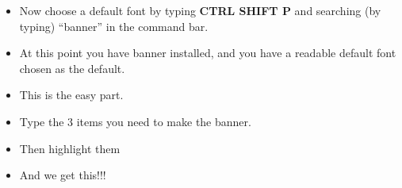 \begin{itemize}
\tightlist
\item
  Now choose a default font by typing \textbf{CTRL SHIFT P} and
  searching (by typing) ``banner'' in the command bar.
\end{itemize}

\begin{itemize}
\tightlist
\item
  At this point you have banner installed, and you have a readable
  default font chosen as the default.
\item
  This is the easy part.
\item
  Type the 3 items you need to make the banner.
\item
  Then highlight them
\end{itemize}

\begin{Shaded}
\begin{Highlighting}[]
\end{Highlighting}
\end{Shaded}

\begin{itemize}
\tightlist
\item
  And we get this!!!
\end{itemize}

